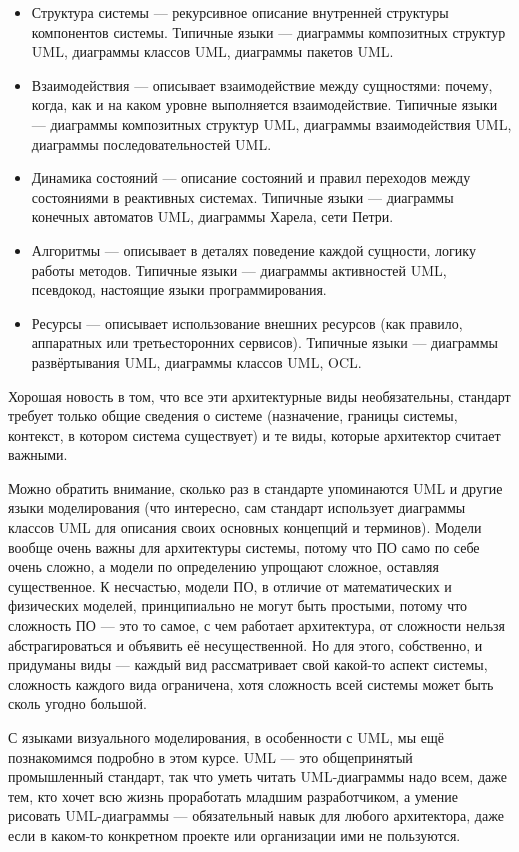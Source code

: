\documentclass{../../text-style}
\begin{document}
\begin{itemize}
    \item Структура системы --- рекурсивное описание внутренней структуры компонентов системы. Типичные языки --- диаграммы композитных структур UML, диаграммы классов UML, диаграммы пакетов UML.
    \item Взаимодействия --- описывает взаимодействие между сущностями: почему, когда, как и на каком уровне выполняется взаимодействие. Типичные языки --- диаграммы композитных структур UML, диаграммы взаимодействия UML, диаграммы последовательностей UML.
    \item Динамика состояний --- описание состояний и правил переходов между состояниями в реактивных системах. Типичные языки --- диаграммы конечных автоматов UML, диаграммы Харела, сети Петри.
    \item Алгоритмы --- описывает в деталях поведение каждой сущности, логику работы методов. Типичные языки --- диаграммы активностей UML, псевдокод, настоящие языки программирования.
    \item Ресурсы --- описывает использование внешних ресурсов (как правило, аппаратных или третьесторонних сервисов). Типичные языки --- диаграммы развёртывания UML, диаграммы классов UML, OCL.
\end{itemize}

Хорошая новость в том, что все эти архитектурные виды необязательны, стандарт требует только общие сведения о системе (назначение, границы системы, контекст, в котором система существует) и те виды, которые архитектор считает важными.

Можно обратить внимание, сколько раз в стандарте упоминаются UML и другие языки моделирования (что интересно, сам стандарт использует диаграммы классов UML для описания своих основных концепций и терминов). Модели вообще очень важны для архитектуры системы, потому что ПО само по себе очень сложно, а модели по определению упрощают сложное, оставляя существенное. К несчастью, модели ПО, в отличие от математических и физических моделей, принципиально не могут быть простыми, потому что сложность ПО --- это то самое, с чем работает архитектура, от сложности нельзя абстрагироваться и объявить её несущественной. Но для этого, собственно, и придуманы виды --- каждый вид рассматривает свой какой-то аспект системы, сложность каждого вида ограничена, хотя сложность всей системы может быть сколь угодно большой.

С языками визуального моделирования, в особенности с UML, мы ещё познакомимся подробно в этом курсе. UML --- это общепринятый промышленный стандарт, так что уметь читать UML-диаграммы надо всем, даже тем, кто хочет всю жизнь проработать младшим разработчиком, а умение рисовать UML-диаграммы --- обязательный навык для любого архитектора, даже если в каком-то конкретном проекте или организации ими  не пользуются.
\end{document}
